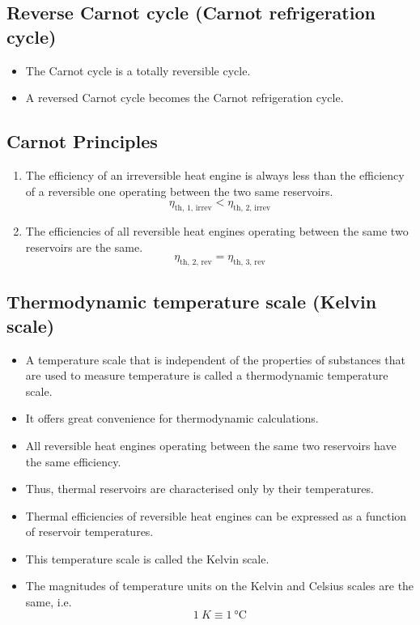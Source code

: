\documentclass[11pt]{article}
\begin{document}
\subsection{Reverse Carnot cycle (Carnot refrigeration cycle)}
\label{sec:org1e8e22f}
\begin{itemize}
\item The Carnot cycle is a totally reversible cycle.
\item A reversed Carnot cycle becomes the Carnot refrigeration cycle.
\end{itemize}
\subsection{Carnot Principles}
\label{sec:orgeb874a9}
\begin{enumerate}
\item The efficiency of an irreversible heat engine is always less than the efficiency of a reversible one operating between the two same reservoirs.
\[\eta_{\text{th, 1, irrev}} < \eta_{\text{th, 2, irrev}}\]
\item The efficiencies of all reversible heat engines operating between the same two reservoirs are the same.
\[\eta_{\text{th, 2, rev}} = \eta_{\text{th, 3, rev}}\]
\end{enumerate}

 \newpage
\subsection{Thermodynamic temperature scale (Kelvin scale)}
\label{sec:org44d6823}
\begin{itemize}
\item A temperature scale that is independent of the properties of substances that are used to measure temperature is called a thermodynamic temperature scale.
\item It offers great convenience for thermodynamic calculations.
\item All reversible heat engines operating between the same two reservoirs have the same efficiency.
\item Thus, thermal reservoirs are characterised only by their temperatures.
\item Thermal efficiencies of reversible heat engines can be expressed as a function of reservoir temperatures.
\item This temperature scale is called the Kelvin scale.
\item The magnitudes of temperature units on the Kelvin and Celsius scales are the same, i.e.
\[\qty{1}{K} \equiv \qty{1}{\degreeCelsius}\]
\end{itemize}
\end{document}
